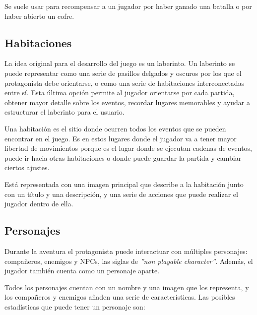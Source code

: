 Se suele usar para recompensar a un jugador por haber ganado una batalla o por haber abierto un cofre.

\subsection{Habitaciones}
La idea original para el desarrollo del juego es un laberinto. Un laberinto se puede representar como una serie de pasillos delgados y oscuros por los que el protagonista debe orientarse, o como una serie de habitaciones interconectadas entre sí.
Esta última opción permite al jugador orientarse por cada partida, obtener mayor detalle sobre los eventos, recordar lugares memorables y ayudar a estructurar el laberinto para el usuario. 

Una habitación es el sitio donde ocurren todos los eventos que se pueden encontrar en el juego. Es en estos lugares donde el jugador va a tener mayor libertad de movimientos porque es el lugar donde se ejecutan cadenas de eventos, puede ir hacia otras habitaciones o donde puede guardar la partida y cambiar ciertos ajustes.

Está representada con una imagen principal que describe a la habitación junto con un título y una descripción, y una serie de acciones que puede realizar el jugador dentro de ella.

\subsection{Personajes}
Durante la aventura el protagonista puede interactuar con múltiples personajes: compañeros, enemigos y NPCs, las siglas de \textit{''non playable character''}. \cite{npcGeekno} Además, el jugador también cuenta como un personaje aparte.

Todos los personajes cuentan con un nombre y una imagen que los representa, y los compañeros y enemigos añaden una serie de características.
Las posibles estadísticas que puede tener un personaje son:

